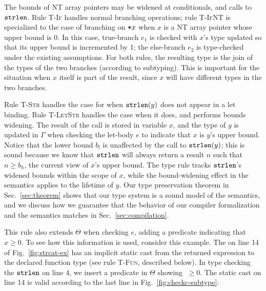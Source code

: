 %
The bounds of NT array pointers may be widened at conditionals, and calls to $\mathtt{strlen}$.  Rule \textsc{T-If} handles normal
branching operations; rule \textsc{T-IfNT} is specialized to the case
of branching on $\texttt{*}{x}$ when $x$ is a NT array pointer whose upper
bound is 0. In this case, true-branch $e_1$ is checked with $x$'s type
updated so that its upper bound is incremented by 1; the else-branch
$e_2$ is type-checked under the existing assumptions. For both rules,
the resulting type is the join of the types of the two branches
(according to subtyping). This is important for the situation when $x$
itself is part of the result, since $x$ will have
different types in the two branches.


Rule \textsc{T-Str} handles the case for when $\mathtt{strlen}(y)$ does
not appear in a let binding. Rule \textsc{T-LetStr} handles the case
when it does, and performs bounds widening. The result of the call is
stored in variable $x$, and the type of $y$ is updated in $\Gamma$ when
checking the let-body $e$ to indicate that $x$ is $y$'s upper
bound. Notice that the lower bound $b_l$ is unaffected by the call to
$\mathtt{strlen}(y)$; this is sound because we know that $\mathtt{strlen}$
will always return a result $n$ such that $n \ge b_h$, the current
view of $x$'s upper bound.
The type rule tracks $\mathtt{strlen}$'s widened bounds
within the scope of $x$, while the bound-widening effect in the semantics applies to the lifetime of $y$.
Our type preservation theorem in Sec.~\ref{sec:theorem}
shows that our type system is a sound model of the \CoreChkC semantics,
and we discuss how we guarantee that the behavior of our compiler formalization and the semantics matches in Sec.~\ref{sec:compilation}.

This rule also extends $\Theta$ when checking $e$, adding a predicate
indicating that $x\ge 0$. To see how this information is used,
consider this example.  The  on line 14 of
Fig.~\ref{fig:strcat-ex} has an implicit static cast from the
returned expression to the declared function type (see rule
\textsc{T-Fun}, described below). In type checking the $\mathtt{strlen}$
on line 4, we insert a predicate in $\Theta$ showing
$\;\ge 0$.  The static cast on line 14 is valid according to
the last line in Fig.~\ref{fig:checkc-subtype}:

